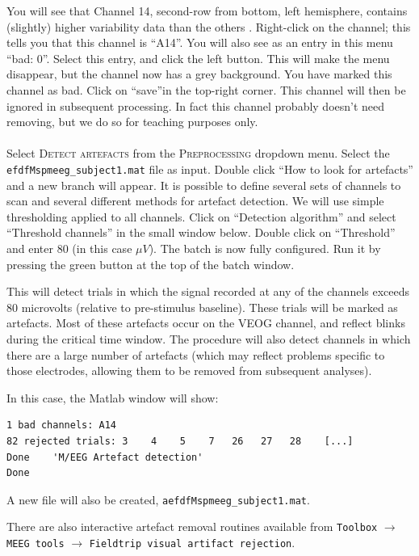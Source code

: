 You will see that Channel 14, second-row from bottom, left hemisphere, contains (slightly) higher variability data than the others .
Right-click on the channel; this tells you that this channel is ``A14''. You will also see as an entry in this menu ``bad: 0''. Select this entry, and click the left button. This will make the menu disappear, but the channel now has a grey background. You have marked this channel as bad. Click on ``save''in the top-right corner. This channel will then be ignored in subsequent processing. In fact this channel probably doesn't need removing, but we do so for teaching purposes only.
\\
\\
Select \textsc{Detect artefacts} from the \textsc{Preprocessing} dropdown menu. Select the \texttt{efdfMspmeeg\_subject1.mat} file as input.  Double click ``How to look for artefacts'' and a new branch will appear. It is possible to define several sets of channels to scan and several different methods for artefact detection. We will use simple thresholding applied to all channels. Click on ``Detection algorithm'' and select ``Threshold channels'' in the small window below. Double click on ``Threshold'' and enter 80 (in this case $\mu V$). The batch is now fully configured. Run it by pressing the green button at the top of the batch window.

This will detect trials in which the signal recorded at any of the channels exceeds 80 microvolts (relative to pre-stimulus baseline). These trials will be marked as artefacts. Most of these artefacts occur on the VEOG channel, and reflect blinks during the critical time window. The procedure will also detect channels in which there are a large number of artefacts (which may reflect problems specific to those electrodes, allowing them to be removed from subsequent analyses).

In this case, the Matlab window will show:
\begin{verbatim}
1 bad channels: A14
82 rejected trials: 3    4    5    7   26   27   28    [...]
Done    'M/EEG Artefact detection'
Done
\end{verbatim}
A new file will also be created, \texttt{aefdfMspmeeg\_subject1.mat}.

There are also interactive artefact removal routines available from \texttt{Toolbox} $\rightarrow$ \texttt{MEEG tools} $\rightarrow$  \texttt{Fieldtrip visual artifact rejection}.

